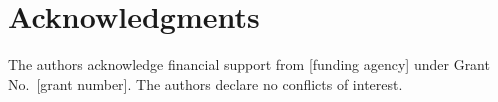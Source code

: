 \documentclass[12pt]{article}
\begin{document}
\section*{Acknowledgments}
The authors acknowledge financial support from [funding agency] under
Grant No.\ [grant number]. The authors declare no conflicts of interest.

%


\end{document}
